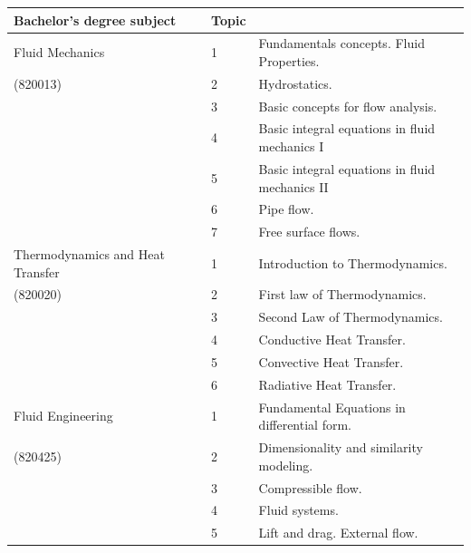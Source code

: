 \documentclass{article}
\begin{document}
\begin{tabular}{l l l }
{\bf Bachelor's degree subject}       &  {\bf Topic}  & $\ $                                                 \\ 
\hline
Fluid Mechanics     & 1             &  Fundamentals concepts. Fluid Properties.            \\ 
(820013)            & 2             &  Hydrostatics.                                       \\
$\ $                & 3             &  Basic concepts for flow analysis.                   \\
$\ $                & 4             &  Basic integral equations in fluid mechanics I       \\
$\ $                & 5             &  Basic integral equations in fluid mechanics II      \\   
$\ $                & 6             &  Pipe flow.                                          \\
$\ $                & 7             &  Free surface flows.                                 \\
\hline
Thermodynamics and Heat Transfer  $\quad\quad$ & 1    &  Introduction to Thermodynamics.   \\ 
(820020)            & 2             &  First law of Thermodynamics.                        \\
$\ $                & 3             &  Second Law of Thermodynamics.                       \\
$\ $                & 4             &  Conductive Heat Transfer.                           \\
$\ $                & 5             &  Convective Heat Transfer.                           \\   
$\ $                & 6             &  Radiative Heat Transfer.                            \\
\hline
Fluid Engineering   & 1             &  Fundamental Equations in differential form.         \\ 
(820425)            & 2             &  Dimensionality and similarity modeling.             \\
$\ $                & 3             &  Compressible flow.                                  \\
$\ $                & 4             &  Fluid systems.                                      \\
$\ $                & 5             &  Lift and drag. External flow.                       \\   

\end{tabular}
\end{document}

